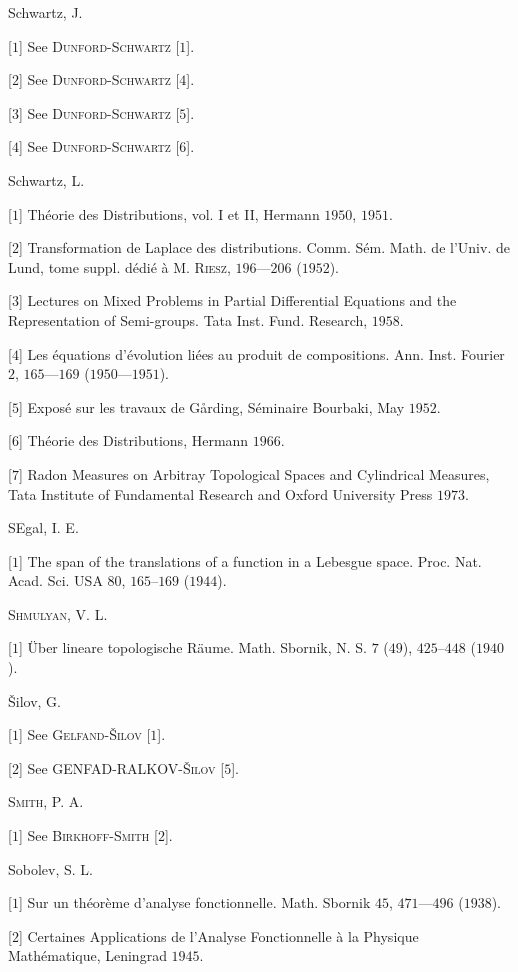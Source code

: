 Schwartz, J. 

[$1$] See \textsc{Dunford}-\textsc{Schwartz} [$1$]. 

[$2$] See \textsc{Dunford}-\textsc{Schwartz} [$4$]. 

[$3$] See \textsc{Dunford}-\textsc{Schwartz} [$5$]. 

[$4$] See \textsc{Dunford}-\textsc{Schwartz} [$6$]. 

Schwartz, L. 

[$1$] Théorie des Distributions, vol. I et II, Hermann $1950$, $1951$. 

[$2$] Transformation de Laplace des distributions. Comm. Sém. Math. de l'Univ. de Lund, tome suppl. dédié à M. \textsc{Riesz}, $196$---$206$ ($1952$). 

[$3$] Lectures on Mixed Problems in Partial Differential Equations and the Representation of Semi-groups. Tata Inst. Fund. Research, $1958$. 

[$4$] Les équations d'évolution liées au produit de compositions. Ann. Inst. Fourier $2$, $165$---$169$ ($1950$---$1951$). 

[$5$] Exposé sur les travaux de Gårding, Séminaire Bourbaki, May $1952$. 

[$6$] Théorie des Distributions, Hermann $1966$. 

[$7$] Radon Measures on Arbitray Topological Spaces and Cylindrical Measures, Tata Institute of Fundamental Research and Oxford University Press $1973$. 

SEgal, I. E. 

[$1$] The span of the translations of a function in a Lebesgue space. Proc. Nat. Acad. Sci. USA $80$, $165$--$169$ ($1944$). 

\textsc{Shmulyan}, V. L. 

[$1$] Über lineare topologische Räume. Math. Sbornik, N. S. $7$ ($49$), $425$--$448$ ($1940$). 

Šilov, G. 

[$1$] See \textsc{Gelfand}-\textsc{Šilov} [$1$]. 

[$2$] See GENFAD-RALKOV-\textsc{Šilov} [$5$]. 

\textsc{Smith}, P. A. 

[$1$] See \textsc{Birkhoff}-\textsc{Smith} [$2$]. 

Sobolev, S. L. 

[$1$] Sur un théorème d'analyse fonctionnelle. Math. Sbornik $45$, $471$---$496$ ($1938$). 

[$2$] Certaines Applications de l'Analyse Fonctionnelle à la Physique Mathématique, Leningrad $1945$. 

